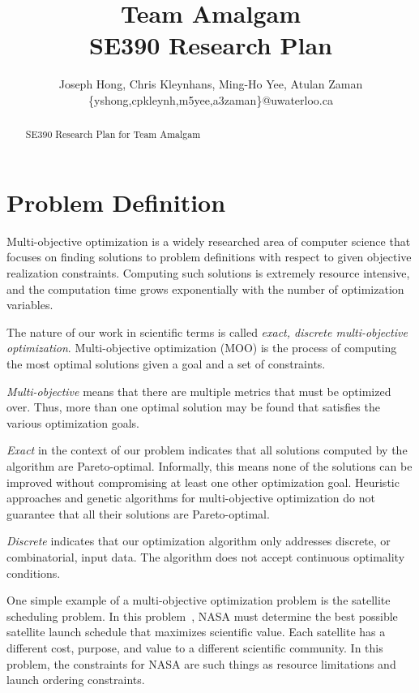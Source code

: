 \documentclass[11pt]{article}
\title{{\Large Team Amalgam} \\ SE390 Research Plan}
\author{Joseph Hong, Chris Kleynhans, Ming-Ho Yee, Atulan Zaman \\
        \{yshong,cpkleynh,m5yee,a3zaman\}@uwaterloo.ca}
\begin{document}
\maketitle

\begin{abstract}
SE390 Research Plan for Team Amalgam
\end{abstract}

\tableofcontents
\newpage

\section{Problem Definition}
Multi-objective optimization is a widely researched area of computer
science that focuses on finding solutions to problem definitions with
respect to given objective realization constraints. Computing such
solutions is extremely resource intensive, and the computation time
grows exponentially with the number of optimization variables.

The nature of our work in scientific terms is called \textit{exact,
discrete multi-objective optimization}. Multi-objective optimization
(MOO) is the process of computing the most optimal solutions given a
goal and a set of constraints.

\textit{Multi-objective} means that there are multiple metrics that
must be optimized over. Thus, more than one optimal solution may be
found that satisfies the various optimization goals.

\textit{Exact} in the context of our problem indicates that all
solutions computed by the algorithm are Pareto-optimal. Informally,
this means none of the solutions can be improved without compromising
at least one other optimization goal. Heuristic approaches and genetic
algorithms for multi-objective optimization do not guarantee that all
their solutions are Pareto-optimal.

\textit{Discrete} indicates that our optimization algorithm only
addresses discrete, or combinatorial, input data. The algorithm does
not accept continuous optimality conditions.

One simple example of a multi-objective optimization problem is the
satellite scheduling problem. In this problem~\cite{ref:nasa11}, NASA
must determine the best possible satellite launch schedule that
maximizes scientific value. Each satellite has a different cost,
purpose, and value to a different scientific community. In this
problem, the constraints for NASA are such things as resource
limitations and launch ordering constraints.
\end{document}
